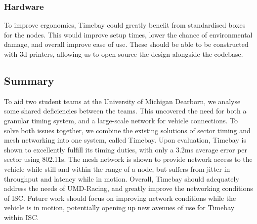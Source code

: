 \documentclass[journal]{IEEEtran}
\begin{document}
\subsubsection{Hardware}
To improve ergonomics, Timebay could greatly benefit from standardised boxes for the nodes. This would improve setup times, lower the chance of environmental damage, and overall improve ease of use. These should be able to be constructed with 3d printers, allowing us to open source the design alongside the codebase.

\subsection{Summary}
To aid two student teams at the University of Michigan Dearborn, we analyse some shared deficiencies between the teams. This uncovered the need for both a granular timing system, and a large-scale network for vehicle connections. To solve both issues together, we combine the existing solutions of sector timing and mesh networking into one system, called Timebay. Upon evaluation, Timebay is shown to excellently fulfill its timing duties, with only a 3.2ms average error per sector using 802.11s. The mesh network is shown to provide network access to the vehicle while still and within the range of a node, but suffers from jitter in throughput and latency while in motion. Overall, Timebay should adequately address the needs of UMD-Racing, and greatly improve the networking conditions of ISC. Future work should focus on improving network conditions while the vehicle is in motion, potentially opening up new avenues of use for Timebay within ISC.

\ifCLASSOPTIONcaptionsoff
  \newpage
\fi




\end{document}
